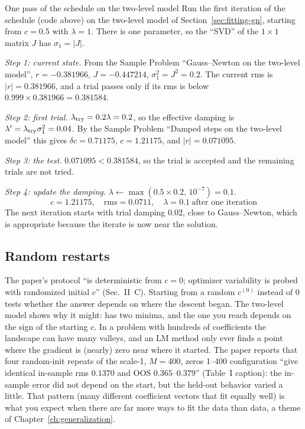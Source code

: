\begin{sample}{One pass of the schedule on the two-level model}
Run the first iteration of the schedule (code above) on the two-level model of Section~\ref{sec:fitting-gn}, starting from $c=0.5$ with $\lambda=1$. There is one parameter, so the ``SVD'' of the $1\times1$ matrix $J$ has $\sigma_1=|J|$.

\emph{Step 1: current state.} From the Sample Problem ``Gauss--Newton on the two-level model'', $r=-0.381966$, $J=-0.447214$, $\sigma_1^2=J^2=0.2$. The current rms is $|r|=0.381966$, and a trial passes only if its rms is below $0.999\times0.381966=0.381584$.

\emph{Step 2: first trial.} $\lambda_{\rm try}=0.2\lambda=0.2$, so the effective damping is $\lambda'=\lambda_{\rm try}\sigma_1^2=0.04$. By the Sample Problem ``Damped steps on the two-level model'' this gives $\delta c=0.71175$, $c=1.21175$, and $|r|=0.071095$.

\emph{Step 3: the test.} $0.071095<0.381584$, so the trial is accepted and the remaining trials are not tried.

\emph{Step 4: update the damping.} $\lambda\leftarrow\max(0.5\times0.2,\,10^{-7})=0.1$.
\[
\boxed{c=1.21175,\quad \mathrm{rms}=0.0711,\quad \lambda=0.1\ \text{after one iteration}}
\]
The next iteration starts with trial damping $0.02$, close to Gauss--Newton, which is appropriate because the iterate is now near the solution.
\end{sample}

\subsection{Random restarts}

The paper's protocol ``is deterministic from $c=0$; optimizer variability is probed with randomized initial $c$'' (Sec.~II~C). Starting from a random $c^{(0)}$ instead of $0$ tests whether the answer depends on where the descent began. The two-level model shows why it might:  has two minima, and the one you reach depends on the sign of the starting $c$. In a problem with hundreds of coefficients the landscape can have many valleys, and an LM method only ever finds a point where the gradient is (nearly) zero near where it started. The paper reports that four random-init repeats of the scale-1, $M=400$, zeros 1--400 configuration ``give identical in-sample rms $0.1370$ and OOS $0.365$--$0.379$'' (Table~I caption): the in-sample error did not depend on the start, but the held-out behavior varied a little. That pattern (many different coefficient vectors that fit equally well) is what you expect when there are far more ways to fit the data than data, a theme of Chapter~\ref{ch:generalization}.

